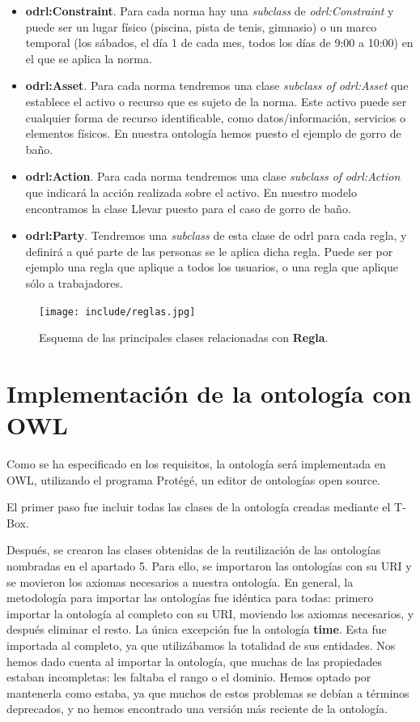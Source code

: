 \documentclass[a4paper,12pt]{article}
\begin{document}
	\begin{itemize}
		\item \textbf{odrl:Constraint}. Para cada norma hay una \textit{subclass} de \textit{odrl:Constraint} y puede ser un lugar físico (piscina, pista de tenis, gimnasio) o un marco temporal (los sábados, el día 1 de cada mes, todos los días de 9:00 a 10:00) en el que se aplica la norma.
		\item \textbf{odrl:Asset}. Para cada norma tendremos una clase \textit{subclass of} \textit{odrl:Asset} que establece el activo o recurso que es sujeto de la norma. Este activo puede ser cualquier forma de recurso identificable, como datos/información, servicios o elementos físicos. En nuestra ontología hemos puesto el ejemplo de gorro de baño.
		\item \textbf{odrl:Action}. Para cada norma tendremos una clase \textit{subclass of} \textit{odrl:Action} que indicará la acción realizada sobre el activo. En nuestro modelo encontramos la clase Llevar puesto para el caso de gorro de baño.
		\item \textbf{odrl:Party}. Tendremos una \textit{subclass} de esta clase de odrl para cada regla, y definirá a qué parte de las personas se le aplica dicha regla. Puede ser por ejemplo una regla que aplique a todos los usuarios, o una regla que aplique sólo a trabajadores.
	\end{itemize}
	
	\begin{figure}[H]
		\centering
		\texttt{[image: include/reglas.jpg]}
		\caption{Esquema de las principales clases relacionadas con \textbf{Regla}.}
	\end{figure}
	
	\section{Implementación de la ontología con OWL}
	
	Como se ha especificado en los requisitos, la ontología será implementada en OWL, utilizando el programa Protégé, un editor de ontologías open source.
	
	El primer paso fue incluir todas las clases de la ontología creadas mediante el T-Box.
	
	Después, se crearon las clases obtenidas de la reutilización de las ontologías nombradas en el apartado 5. Para ello, se importaron las ontologías con su URI y se movieron los axiomas necesarios a nuestra ontología. En general, la metodología para importar las ontologías fue idéntica para todas: primero importar la ontología al completo con su URI, moviendo los axiomas necesarios, y después eliminar el resto. La única excepción fue la ontología \textbf{time}. Esta fue importada al completo, ya que utilizábamos la totalidad de sus entidades. Nos hemos dado cuenta al importar la ontología, que muchas de las propiedades estaban incompletas: les faltaba el rango o el dominio. Hemos optado por mantenerla como estaba, ya que muchos de estos problemas se debían a términos deprecados, y no hemos encontrado una versión más reciente de la ontología. 
	
\end{document}
